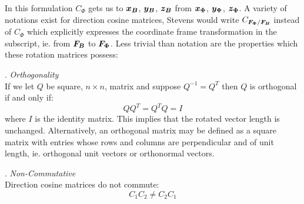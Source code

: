 \documentclass[12pt]{ucthesis}
\begin{document}
In this formulation $C_{\Phi}$ gets us to $\boldsymbol{x_B}$, $\boldsymbol{y_B}$, $\boldsymbol{z_B}$ from $\boldsymbol{x_{\Phi}}$, $\boldsymbol{y_{\Phi}}$, $\boldsymbol{z_{\Phi}}$. A variety of notations exist for direction cosine matrices, Stevens would write $C_{\boldsymbol{F_{\Phi}}/\boldsymbol{F_{B}}}$ instead of $C_{\Phi}$ which explicitly expresses the coordinate frame transformation in the subscript, ie. from $\boldsymbol{F_{B}}$ to $\boldsymbol{F_{\Phi}}$. Less trivial than notation are the properties which these rotation matrices possess:

. \textit{Orthogonality} \\
\indent If we let $Q$ be square, $n \times n$, matrix and suppose $Q^{-1}=Q^T$ then $Q$ is orthogonal if and only if: 
	\begin{equation}
		QQ^T=Q^TQ=I
		\label{eq: DCM_orthogonality}
	\end{equation}
where $I$ is the identity matrix. This implies that the rotated vector length is unchanged. %
Alternatively, an orthogonal matrix may be defined as a square matrix with entries whose rows and columns are perpendicular and of unit length, ie. orthogonal unit vectors or orthonormal vectors. %

. \textit{Non-Commutative} \\
\indent Direction cosine matrices do not commute:
	\begin{equation}
		C_1 C_2 \neq C_2 C_1
		\label{eq: DCM_non_commutative}
	\end{equation}
\end{document}
